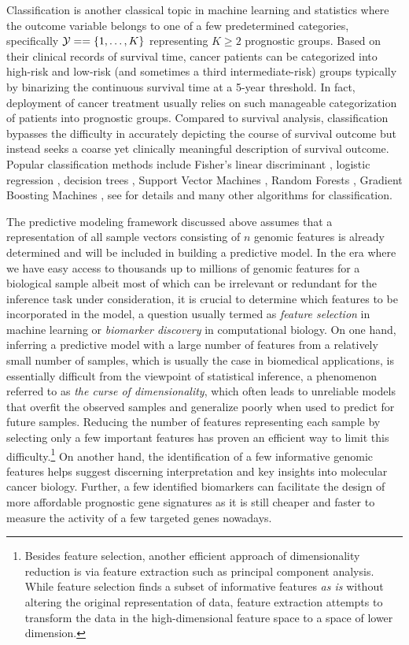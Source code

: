 Classification is another classical topic in machine learning and statistics where the outcome variable belongs to one of a few predetermined categories, specifically $\mathcal{Y} =  = \{1,\dots,K\}$ representing $K \geq 2$ prognostic groups. Based on their clinical records of survival time, cancer patients can be categorized into high-risk and low-risk (and sometimes a third intermediate-risk) groups typically by binarizing the continuous survival time at a 5-year threshold. In fact, deployment of cancer treatment usually relies on such manageable categorization of patients into prognostic groups. Compared to survival analysis, classification bypasses the difficulty in accurately depicting the course of survival outcome but instead seeks a coarse yet clinically meaningful description of survival outcome. Popular classification methods include Fisher's linear discriminant \cite{Fisher1936use}, logistic regression \cite{Cox1958Regression}, decision trees \cite{Breiman1984Classification}, Support Vector Machines \cite{Cortes1995Support}, Random Forests \cite{Breiman2001Random}, Gradient Boosting Machines \cite{Friedman2001Greedy}, see \cite{Hastie2009Elements} for details and many other algorithms for classification.


The predictive modeling framework discussed above assumes that a representation of all sample vectors consisting of $n$ genomic features is already determined and will be included in building a predictive model. In the era where we have easy access to thousands up to millions of genomic features for a biological sample albeit most of which can be irrelevant or redundant for the inference task under consideration, it is crucial to determine which features to be incorporated in the model, a question usually termed as \textit{feature selection} in machine learning or \textit{biomarker discovery} in computational biology. On one hand, inferring a predictive model with a large number of features from a relatively small number of samples, which is usually the case in biomedical applications, is essentially difficult from the viewpoint of statistical inference, a phenomenon referred to as \textit{the curse of dimensionality}, which often leads to unreliable models that overfit the observed samples and generalize poorly when used to predict for future samples. Reducing the number of features representing each sample by selecting only a few important features has proven an efficient way to limit this difficulty.\footnote{Besides feature selection, another efficient approach of dimensionality reduction is via feature extraction such as principal component analysis. While feature selection finds a subset of informative features \textit{as is} without altering the original representation of data, feature extraction attempts to transform the data in the high-dimensional feature space to a space of lower dimension.} On another hand, the identification of a few informative genomic features helps suggest discerning interpretation and key insights into molecular cancer biology. Further, a few identified biomarkers can facilitate the design of more affordable prognostic gene signatures as it is still cheaper and faster to measure the activity of a few targeted genes nowadays.


